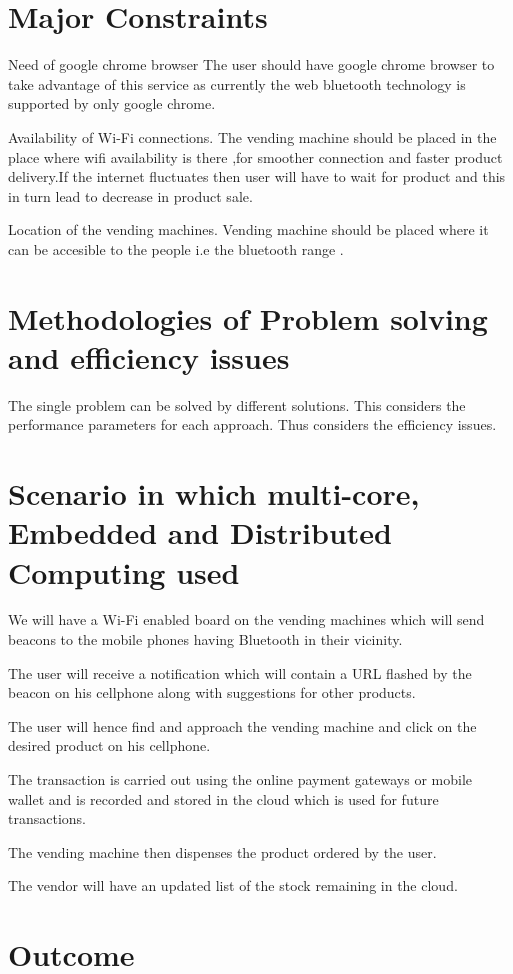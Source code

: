 \documentclass[oneside,a4paper,12pt]{report}
\begin{document}
\section{Major Constraints}
Need of google chrome browser
The user should have google chrome browser to take advantage of this service as currently the web bluetooth technology is supported by only google chrome.

Availability of Wi-Fi connections.
The vending machine should be placed in the place where wifi availability is there ,for smoother connection and faster product delivery.If the internet fluctuates then user will have to wait for product and this in turn lead to decrease in product sale.
 
Location of the vending machines.
Vending machine should be placed where it can be accesible to the people i.e the bluetooth range .


\section{Methodologies of Problem solving and efficiency issues}
The single problem can be solved by different solutions.  This considers the performance parameters for each approach. Thus considers the efficiency issues.

\section{Scenario in which multi-core, Embedded and Distributed Computing used}

 We will have a Wi-Fi enabled board on the vending machines which will send beacons to the mobile phones having Bluetooth in their vicinity.
 
 The user will receive a notification which will contain a URL flashed by the beacon on his cellphone along with suggestions for other products.

The user will hence find and approach the vending machine and click on the desired product on his cellphone.

 The transaction is carried out using the online payment gateways or mobile wallet and is recorded and stored in the cloud which is used for future transactions.

 The vending machine then dispenses the product ordered by the user.

The vendor will have an updated list of the stock remaining in the cloud.

\section{Outcome}
\end{document}
